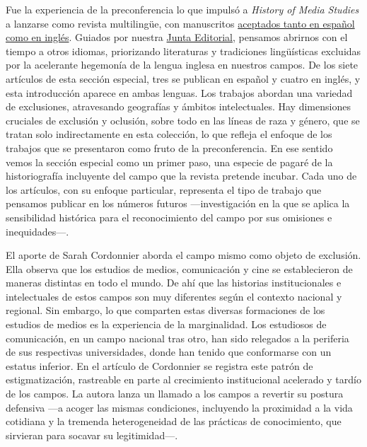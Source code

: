 \documentclass{tufte-handout}
\begin{document}
Fue la experiencia de la preconferencia lo que impulsó a \emph{History
of Media Studies} a lanzarse como revista multilingüe, con manuscritos
\href{https://hms.mediastudies.press/author-guidelines}{aceptados tanto
en español como en inglés}. Guiados por nuestra
\href{https://hms.mediastudies.press/editorial}{Junta Editorial},
pensamos abrirnos con el tiempo a otros idiomas, priorizando literaturas
y tradiciones lingüísticas excluidas por la acelerante hegemonía de la
lengua inglesa en nuestros campos. De los siete artículos de esta
sección especial, tres se publican en español y cuatro en inglés, y esta
introducción aparece en ambas lenguas. Los trabajos abordan una variedad
de exclusiones, atravesando geografías y ámbitos intelectuales. Hay
dimensiones cruciales de exclusión y oclusión, sobre todo en las líneas
de raza y género, que se tratan solo indirectamente en esta colección,
lo que refleja el enfoque de los trabajos que se presentaron como fruto
de la preconferencia. En ese sentido vemos la sección especial como un
primer paso, una especie de pagaré de la historiografía incluyente del
campo que la revista pretende incubar. Cada uno de los artículos, con su
enfoque particular, representa el tipo de trabajo que pensamos publicar
en los números futuros ---investigación en la que se aplica la
sensibilidad histórica para el reconocimiento del campo por sus
omisiones e inequidades---.

El aporte de Sarah Cordonnier aborda el campo mismo como objeto de
exclusión. Ella observa que los estudios de medios, comunicación y cine
se establecieron de maneras distintas en todo el mundo. De ahí que las
historias institucionales e intelectuales de estos campos son muy
diferentes según el contexto nacional y regional. Sin embargo, lo que
comparten estas diversas formaciones de los estudios de medios es la
experiencia de la marginalidad. Los estudiosos de comunicación, en un
campo nacional tras otro, han sido relegados a la periferia de sus
respectivas universidades, donde han tenido que conformarse con un
estatus inferior. En el artículo de Cordonnier se registra este patrón
de estigmatización, rastreable en parte al crecimiento institucional
acelerado y tardío de los campos. La autora lanza un llamado a los
campos a revertir su postura defensiva ---a acoger las mismas
condiciones, incluyendo la proximidad a la vida cotidiana y la tremenda
heterogeneidad de las prácticas de conocimiento, que sirvieran para
socavar su legitimidad---.
\end{document}

